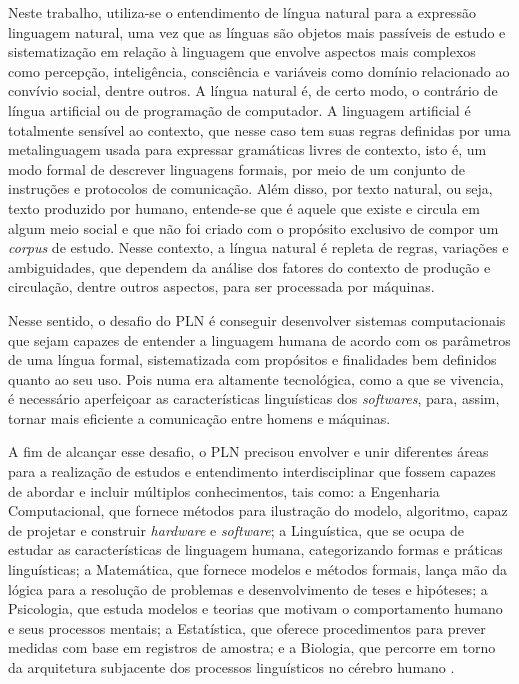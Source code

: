 \documentclass[portuguese]{textolivre}
\begin{document}
Neste trabalho, utiliza-se o entendimento de língua natural para a expressão linguagem natural, uma vez que as línguas são objetos mais passíveis de estudo e sistematização em relação à linguagem que envolve aspectos mais complexos como percepção, inteligência, consciência e variáveis como domínio relacionado ao convívio social, dentre outros. A língua natural é, de certo modo, o contrário de língua artificial ou de programação de computador. A linguagem artificial é totalmente sensível ao contexto, que nesse caso tem suas regras definidas por uma metalinguagem usada para expressar gramáticas livres de contexto, isto é, um modo formal de descrever linguagens formais, por meio de um conjunto de instruções e protocolos de comunicação. Além disso, por texto natural, ou seja, texto produzido por humano, entende-se que é aquele que existe e circula em algum meio social e que não foi criado com o propósito exclusivo de compor um \textit{corpus} de estudo. Nesse contexto, a língua natural é repleta de regras, variações e ambiguidades, que dependem da análise dos fatores do contexto de produção e circulação, dentre outros aspectos, para ser processada por máquinas.

Nesse sentido, o desafio do PLN é conseguir desenvolver sistemas computacionais que sejam capazes de entender a linguagem humana de acordo com os parâmetros de uma língua formal, sistematizada com propósitos e finalidades bem definidos quanto ao seu uso. Pois numa era altamente tecnológica, como a que se vivencia, é necessário aperfeiçoar as características linguísticas dos \textit{softwares}, para, assim, tornar mais eficiente a comunicação entre homens e máquinas.

A fim de alcançar esse desafio, o PLN precisou envolver e unir diferentes áreas para a realização de estudos e entendimento interdisciplinar que fossem capazes de abordar e incluir múltiplos conhecimentos, tais como: a Engenharia Computacional, que fornece métodos para ilustração do modelo, algoritmo, capaz de projetar e construir \textit{hardware} e \textit{software}; a Linguística, que se ocupa de estudar as características de linguagem humana, categorizando formas e práticas linguísticas; a Matemática, que fornece modelos e métodos formais, lança mão da lógica para a resolução de problemas e desenvolvimento de teses e hipóteses; a Psicologia, que estuda modelos e teorias que motivam o comportamento humano e seus processos mentais; a Estatística, que oferece procedimentos para prever medidas com base em registros de amostra; e a Biologia, que percorre em torno da arquitetura subjacente dos processos linguísticos no cérebro humano \cite{manaris_natural_1998}.
\end{document}

